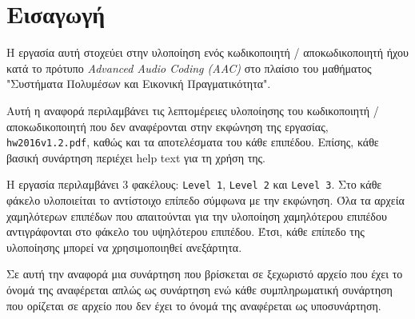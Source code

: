 \section{Εισαγωγή}
Η εργασία αυτή στοχεύει στην υλοποίηση ενός κωδικοποιητή / αποκωδικοποιητή ήχου κατά το πρότυπο \textit{Advanced Audio Coding (AAC)} στο πλαίσιο του μαθήματος "Συστήματα Πολυμέσων και Εικονική Πραγματικότητα".

\sloppy Αυτή η αναφορά περιλαμβάνει τις λεπτομέρειες υλοποίησης του κωδικοποιητή / αποκωδικοποιητή που δεν αναφέρονται στην εκφώνηση της εργασίας, \texttt{hw2016v1.2.pdf}, καθώς και τα αποτελέσματα του κάθε επιπέδου.
Επίσης, κάθε βασική συνάρτηση περιέχει help text για τη χρήση της.

Η εργασία περιλαμβάνει 3 φακέλους: \texttt{Level 1}, \texttt{Level 2} και \texttt{Level 3}.
Στο κάθε φάκελο υλοποιείται το αντίστοιχο επίπεδο σύμφωνα με την εκφώνηση.
Όλα τα αρχεία χαμηλότερων επιπέδων που απαιτούνται για την υλοποίηση χαμηλότερου επιπέδου αντιγράφονται στο φάκελο του υψηλότερου επιπέδου.
Έτσι, κάθε επίπεδο της υλοποίησης μπορεί να χρησιμοποιηθεί ανεξάρτητα.

Σε αυτή την αναφορά μια συνάρτηση που βρίσκεται σε ξεχωριστό αρχείο που έχει το όνομά της αναφέρεται απλώς ως συνάρτηση ενώ κάθε συμπληρωματική συνάρτηση που ορίζεται σε αρχείο που δεν έχει το όνομά της αναφέρεται ως υποσυνάρτηση.
